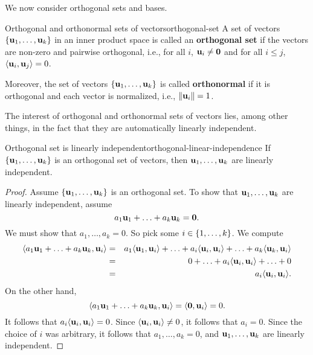 We now consider orthogonal sets and bases.

\begin{definition}{Orthogonal and orthonormal sets of vectors}{orthogonal-set}
  A set of vectors $\set{\vect{u}_1,\ldots,\vect{u}_k}$ in an inner
  product space is called an \textbf{orthogonal set}%
   if the vectors are non-zero and pairwise
  orthogonal, i.e., for all $i$, $\vect{u}_i\neq\vect{0}$ and for all
  $i\leq j$, $\iprod{\vect{u}_i,\vect{u}_j}=0$.
  \smallskip\smallskip

  Moreover, the set of vectors $\set{\vect{u}_1,\ldots,\vect{u}_k}$ is
  called \textbf{orthonormal}%
   if it is orthogonal and each vector is
  normalized, i.e., $\norm{\vect{u}_i}=1$.
\end{definition}

The interest of orthogonal and orthonormal sets of vectors lies, among
other things, in the fact that they are automatically linearly
independent.

\begin{proposition}{Orthogonal set is linearly independent}{orthogonal-linear-independence}
  If $\set{\vect{u}_1,\ldots,\vect{u}_k}$ is an orthogonal set of
  vectors, then $\vect{u}_1,\ldots,\vect{u}_k$ are linearly
  independent.
\end{proposition}

\begin{proof}
  Assume $\set{\vect{u}_1,\ldots,\vect{u}_k}$ is an orthogonal set. To
  show that $\vect{u}_1,\ldots,\vect{u}_k$ are linearly
  independent, assume
  \begin{equation*}
    a_1\vect{u}_1 + \ldots + a_k\vect{u}_k = \vect{0}.
  \end{equation*}
  We must show that $a_1,\ldots,a_k = 0$. So pick some
  $i\in\left\{1,\ldots,k\right\}$. We compute
  \begin{eqnarray*}
    \iprod{a_1\vect{u}_1 + \ldots + a_k\vect{u}_k, \vect{u}_i}
    &=& a_1\iprod{\vect{u}_1,\vect{u}_i}
        + \ldots
        + a_i\iprod{\vect{u}_i,\vect{u}_i}
        + \ldots
        + a_k\iprod{\vect{u}_k,\vect{u}_i} \\
    &=& 0
        + \ldots
        + a_i\iprod{\vect{u}_i,\vect{u}_i}
        + \ldots
        + 0 \\
    &=& a_i \iprod{\vect{u}_i,\vect{u}_i}.
  \end{eqnarray*}
  On the other hand,
  \begin{equation*}
    \iprod{a_1\vect{u}_1 + \ldots + a_k\vect{u}_k, \vect{u}_i}
    = \iprod{\vect{0}, \vect{u}_i} = 0.
  \end{equation*}
  It follows that $a_i \iprod{\vect{u}_i,\vect{u}_i} = 0$. Since
  $\iprod{\vect{u}_i,\vect{u}_i}\neq 0$, it follows that
  $a_i=0$. Since the choice of $i$ was arbitrary, it follows that
  $a_1,\ldots,a_k = 0$, and $\vect{u}_1,\ldots,\vect{u}_k$ are
  linearly independent.
\end{proof}

